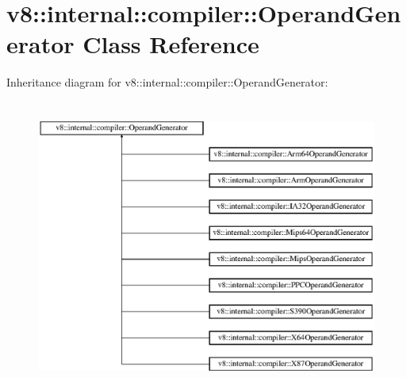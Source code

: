 \hypertarget{classv8_1_1internal_1_1compiler_1_1_operand_generator}{}\section{v8\+:\+:internal\+:\+:compiler\+:\+:Operand\+Generator Class Reference}
\label{classv8_1_1internal_1_1compiler_1_1_operand_generator}
Inheritance diagram for v8\+:\+:internal\+:\+:compiler\+:\+:Operand\+Generator\+:\begin{figure}[H]
\begin{center}
\leavevmode
\includegraphics[height=9.655172cm]{classv8_1_1internal_1_1compiler_1_1_operand_generator}
\end{center}
\end{figure}
